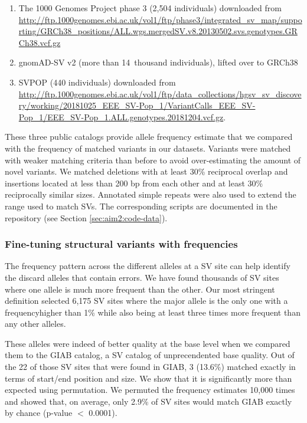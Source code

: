 \documentclass[11pt]{ucscthesis}
\begin{document}
\begin{enumerate}
\item The 1000 Genomes Project phase 3\cite{1000gp_sv_2015} (2,504 individuals) downloaded from \url{http://ftp.1000genomes.ebi.ac.uk/vol1/ftp/phase3/integrated_sv_map/supporting/GRCh38_positions/ALL.wgs.mergedSV.v8.20130502.svs.genotypes.GRCh38.vcf.gz}
\item gnomAD-SV\cite{gnomadsv_2020} v2 (more than 14~thousand individuals), lifted over to GRCh38
\item SVPOP\cite{audano_hgsvc} (440 individuals) downloaded from \url{http://ftp.1000genomes.ebi.ac.uk/vol1/ftp/data_collections/hgsv_sv_discovery/working/20181025_EEE_SV-Pop_1/VariantCalls_EEE_SV-Pop_1/EEE_SV-Pop_1.ALL.genotypes.20181204.vcf.gz}.
\end{enumerate}


These three public catalogs provide allele frequency estimate that we compared with the frequency of matched variants in our datasets.
Variants were matched with weaker matching criteria than before to avoid over-estimating the amount of novel variants.
We matched deletions with at least 30\% reciprocal overlap and insertions located at less than 200 bp from each other and at least 30\% reciprocally similar sizes.
Annotated simple repeats were also used to extend the range used to match SVs.
The corresponding scripts are documented in the repository (see Section \ref{sec:aim2:code-data}).

\subsubsection{Fine-tuning structural variants with frequencies}
\label{subsec:aim2:svfinetuning}


The frequency pattern across the different alleles at a SV site can help identify the discard alleles that contain errors.
We have found thousands of SV sites where one allele is much more frequent than the other.
Our most stringent definition selected 6,175 SV sites where the major allele is the only one with a frequencyhigher than 1\% while also being at least three times more frequent than any other alleles.

These alleles were indeed of better quality at the base level when we compared them to the GIAB catalog\cite{zook_robust_2020}, a SV catalog of unprecendented base quality.
Out of the 22 of those SV sites that were found in GIAB, 3 (13.6\%) matched exactly in terms of start/end position and size.
We show that it is significantly more than expected using permutation.
We permuted the frequency estimates 10,000 times and showed that, on average, only 2.9\% of SV sites would match GIAB exactly by chance (p-value $<$ 0.0001).
\end{document}
